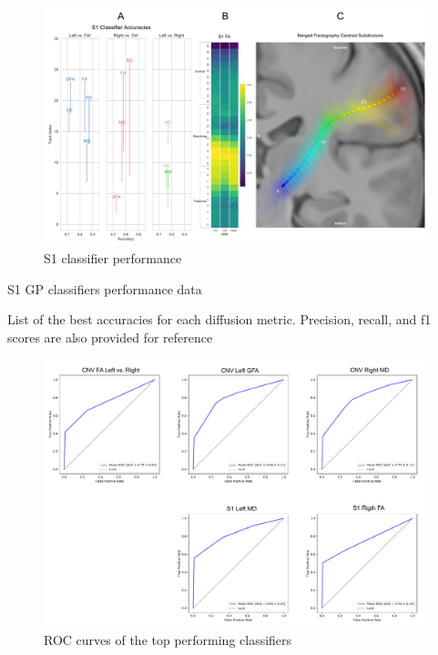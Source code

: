\begin{figure}[h]
\centering
\includegraphics[width=\linewidth]{figure-GP-S1.pdf}
\caption{S1 classifier performance}
\label{fig:GPfigure5}
\end{figure}

\begin{table}[h]
\centering
{}
\caption{S1 GP classifiers performance data}
\caption*{List of the best accuracies for each diffusion metric. Precision, recall, and f1 scores are also provided for reference}
\label{table:s1}
\end{table}

\begin{figure}[h]
\centering
\includegraphics[width=\linewidth]{figure-roc.pdf}
\caption{ROC curves of the top performing classifiers}
\label{fig:GPfigure6}
\end{figure}

